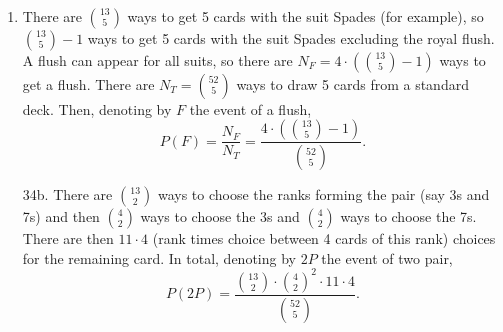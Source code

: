 
\setcounter{theorem}{33}
\begin{exercise}[BH.1.34]
\begin{solution}~
	\begin{enumerate}
		\item There are ${13 \choose 5}$ ways to get 5 cards with the suit Spades (for example), so ${13 \choose 5}-1$ ways to get 5 cards with the suit Spades excluding the royal flush. A flush can appear for all suits, so there are $N_{F}=4\cdot ({13 \choose 5}-1)$ ways to get a flush. There are $N_{T}={52 \choose 5}$ ways to draw 5 cards from a standard deck. Then, denoting by $F$ the event of a flush, $$P(F) = \frac{N_{F}}{N_{T}} = \frac{4 \cdot ({13 \choose 5}-1)}{{52 \choose 5}}.$$
		\item[34b.] There are ${13 \choose 2}$ ways to choose the ranks forming the pair (say 3s and 7s) and then ${4 \choose 2}$ ways to choose the 3s and ${4 \choose 2}$ ways to choose the 7s. There are then $11\cdot 4$ (rank times choice between 4 cards of this rank) choices for the remaining card. In total, denoting by $2P$ the event of two pair,
		$$P(2P) = \frac{{13 \choose 2}\cdot {4 \choose 2}^2 \cdot 11\cdot 4}{{52 \choose 5}}.$$
	\end{enumerate}
\end{solution}
\end{exercise}


